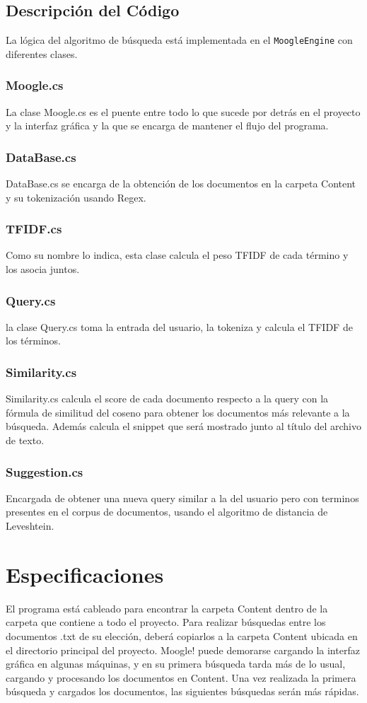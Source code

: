\documentclass[12pt,a4paper]{article}
\begin{document}
\subsection{Descripción del Código}\label{sub:code}
La lógica del algoritmo de búsqueda está implementada en el \texttt{MoogleEngine} con diferentes
clases.
\subsubsection{Moogle.cs}
La clase Moogle.cs es el puente entre todo lo que sucede por detrás en el proyecto y la interfaz gráfica
y la que se encarga de mantener el flujo del programa.
\subsubsection{DataBase.cs}
DataBase.cs se encarga de la obtención de los documentos en la carpeta Content y su tokenización usando Regex.
\subsubsection{TFIDF.cs}
Como su nombre lo indica, esta clase calcula el peso TFIDF de cada término y los asocia juntos.
\subsubsection{Query.cs}
la clase Query.cs toma la entrada del usuario, la tokeniza y calcula el TFIDF de los términos.
\subsubsection{Similarity.cs}
Similarity.cs calcula el score de cada documento respecto a la query con la fórmula de similitud del coseno para obtener los documentos más relevante
a la búsqueda. Además calcula el snippet que será mostrado junto al título del archivo de texto.
\subsubsection{Suggestion.cs}
Encargada de obtener una nueva query similar a la del usuario pero con terminos presentes en el corpus de documentos, usando el algoritmo de distancia de Leveshtein.


\section{Especificaciones}\label{sec:concl}
El programa está cableado para encontrar la carpeta Content dentro
de la carpeta que contiene a todo el proyecto. Para realizar búsquedas
entre los documentos .txt de su elección, deberá copiarlos a la carpeta
Content ubicada en el directorio principal del proyecto.
Moogle! puede demorarse cargando la interfaz gráfica en algunas máquinas,
y en su primera búsqueda tarda más de lo usual, cargando y procesando los
documentos en Content. Una vez realizada la primera búsqueda y cargados
los documentos, las siguientes búsquedas serán más rápidas.
\end{document}
